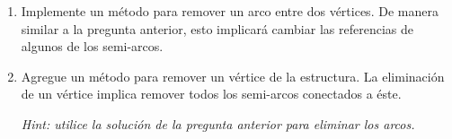 \begin{Exercise}[title={Estructura \textit{Half-edge}}]
\begin{enumerate}
      \item Implemente un método para remover un arco entre dos vértices. 
        De manera similar a la pregunta anterior, esto implicará cambiar las referencias 
        de algunos de los semi-arcos.
      
      \item Agregue un método para remover un vértice de la estructura. 
        La eliminación de un vértice implica remover todos los semi-arcos conectados a 
        éste.
        
        \textit{Hint: utilice la solución de la pregunta anterior para eliminar los 
        arcos.}
    \end{enumerate}
  \end{Exercise}
%